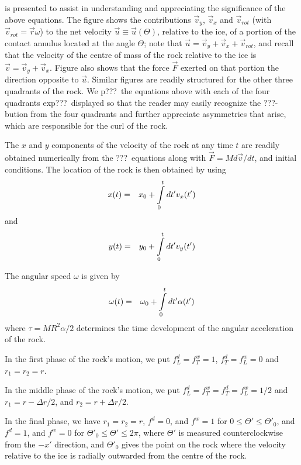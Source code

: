 {\begin{flowtext}{2}
 is presented to assist in understanding and appreciating the
significance of the above equations. The figure shows the contributions
$\vec{v}_y$, $\vec{v}_x$ and $\vec{v}_{rot}$ (with $\vec{v}_{rot} =
\vec{r}\omega$) to the net velocity $\vec{u} \equiv \vec{u}(\Theta)$, relative
to the ice, of a portion of the contact annulus located at the angle $\Theta$;
note that $\vec{u} = \vec{v}_y + \vec{v}_x + \vec{v}_{rot}$, and recall that
the velocity of the centre of mass of the rock relative to the ice is $\vec{v}
= \vec{v}_y + \vec{v}_x$. Figure  also shows that the force
$\vec{F}$ exerted on that portion the direction opposite to $\vec{u}$. Similar
figures are readily structured for the other three quadrants of the rock. We
p???\ the equations above with each of the four quadrants exp???\ displayed so
that the reader may easily recognize the ???-bution from the four quadrants and
further appreciate asymmetries that arise, which are responsible for the curl
of the rock.

The $x$ and $y$ components of the velocity of the rock at any time $t$ are readily obtained
numerically from the ???\ equations along with $\vec{F} = M d\vec{v}/dt$, and
initial conditions. The location of the rock is then obtained by using
\begin{eqnarray}
x(t) &=& x_0 + \int\limits_0^t dt' v_x(t')
\end{eqnarray}
and
\begin{eqnarray}
y(t) &=& y_0 + \int\limits_0^t dt' v_y(t')
\end{eqnarray}

The angular speed $\omega$ is  given by
\begin{eqnarray}
\omega(t) &=& \omega_0 + \int\limits_0^t dt' \alpha(t')
\end{eqnarray}
where $\tau = MR^2\alpha/2$ determines the time development of the angular
acceleration of the rock.

In the first phase of the rock's motion, we put
$f_L^d = f_T^w = 1$,
$f_T^d = f_L^w = 0$ and
$r_1 = r_2 = r$.

In the middle phase of the rock's motion, we put
$f_L^d = f_T^w = f_T^d = f_L^w = 1/2$ and
$r_1 = r - \Delta r/2$, and
$r_2 = r + \Delta r/2$.

In the final phase, we have
$r_1 = r_2 = r$,
$f^d = 0$, and $f^w = 1$ for $0 \le \Theta' \le \Theta'_0$, and
$f^d = 1$, and $f^w = 0$ for $\Theta'_0 \le \Theta' \le 2\pi$, where $\Theta'$
is measured counterclockwise from the $-x'$ direction, and $\Theta'_0$ gives
the point on the rock where the velocity relative to the ice is radially
outwarded from the centre of the rock.


\end{flowtext}}
